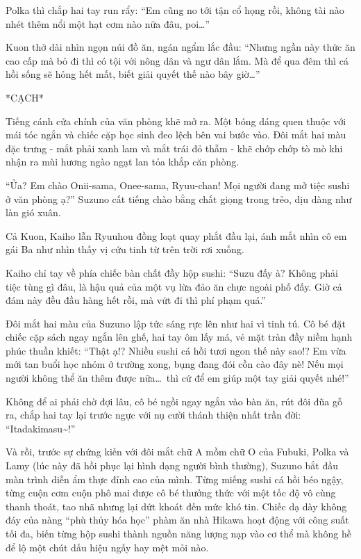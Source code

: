 \documentclass[../main.tex]{subfiles}
\begin{document}
Polka thì chắp hai tay run rẩy: ``Em cũng no tới tận cổ họng rồi, không tài nào nhét thêm nổi một hạt cơm nào nữa đâu, poi\dots''

Kuon thở dài nhìn ngọn núi đồ ăn, ngán ngẩm lắc đầu: ``Nhưng ngần này thức ăn cao cấp mà bỏ đi thì có tội với nông dân và ngư dân lắm. Mà để qua đêm thì cá hồi sống sẽ hỏng hết mất, biết giải quyết thế nào bây giờ\dots''

*CẠCH*

Tiếng cánh cửa chính của văn phòng khẽ mở ra. Một bóng dáng quen thuộc với mái tóc ngắn và chiếc cặp học sinh đeo lệch bên vai bước vào. Đôi mắt hai màu đặc trưng - mắt phải xanh lam và mắt trái đỏ thẫm - khẽ chớp chớp tò mò khi nhận ra mùi hương ngào ngạt lan tỏa khắp căn phòng.

``Ủa? Em chào Onii-sama, Onee-sama, Ryuu-chan! Mọi người đang mở tiệc sushi ở văn phòng ạ?'' Suzuno cất tiếng chào bằng chất giọng trong trẻo, dịu dàng như làn gió xuân.

Cả Kuon, Kaiho lẫn Ryuuhou đồng loạt quay phắt đầu lại, ánh mắt nhìn cô em gái Ba như nhìn thấy vị cứu tinh từ trên trời rơi xuống.

Kaiho chỉ tay về phía chiếc bàn chất đầy hộp sushi: ``Suzu đấy à? Không phải tiệc tùng gì đâu, là hậu quả của một vụ lừa đảo ăn chực ngoài phố đấy. Giờ cả đám này đều đầu hàng hết rồi, mà vứt đi thì phí phạm quá.''

Đôi mắt hai màu của Suzuno lập tức sáng rực lên như hai vì tinh tú. Cô bé đặt chiếc cặp sách ngay ngắn lên ghế, hai tay ôm lấy má, vẻ mặt tràn đầy niềm hạnh phúc thuần khiết: ``Thật ạ!? Nhiều sushi cá hồi tươi ngon thế này sao!? Em vừa mới tan buổi học nhóm ở trường xong, bụng đang đói cồn cào đây nè! Nếu mọi người không thể ăn thêm được nữa\dots\ thì cứ để em giúp một tay giải quyết nhé!''

Không để ai phải chờ đợi lâu, cô bé ngồi ngay ngắn vào bàn ăn, rút đôi đũa gỗ ra, chắp hai tay lại trước ngực với nụ cười thánh thiện nhất trần đời: ``Itadakimasu\~{}!''

Và rồi, trước sự chứng kiến với đôi mắt chữ A mồm chữ O của Fubuki, Polka và Lamy (lúc này đã hồi phục lại hình dạng người bình thường), Suzuno bắt đầu màn trình diễn ẩm thực đỉnh cao của mình. Từng miếng sushi cá hồi béo ngậy, từng cuộn cơm cuộn phô mai được cô bé thưởng thức với một tốc độ vô cùng thanh thoát, tao nhã nhưng lại dứt khoát đến mức khó tin. Chiếc dạ dày không đáy của nàng ``phù thủy hóa học'' phàm ăn nhà Hikawa hoạt động với công suất tối đa, biến từng hộp sushi thành nguồn năng lượng nạp vào cơ thể mà không hề để lộ một chút dấu hiệu ngấy hay mệt mỏi nào.
\end{document}
